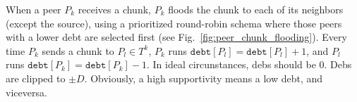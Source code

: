 \label{sec:chunk_flooding}
\begin{figure*}
  \caption{Chunk flooding at peers.\label{fig:peer_chunk_flooding}}
\end{figure*}
When a peer $P_k$ receives a chunk, $P_k$ floods the chunk to each of
its neighbors (except the source), using a prioritized round-robin
schema where those peers with a lower debt are selected first (see
Fig.~\ref{fig:peer_chunk_flooding}). Every time $P_k$ sends a chunk to
$P_l\in T^k$, $P_k$ runs $\mathtt{debt}[P_l] = \mathtt{debt}[P_l]+1$,
and $P_l$ runs $\mathtt{debt}[P_k] = \mathtt{debt}[P_k]-1$. In ideal
circunstances, debs should be $0$. Debs are clipped to $\pm
D$. Obviously, a high supportivity means a low debt, and viceversa.

\begin{comment}
In each round, peers check if a chunk have been received from the rest
of peers of the team (${\cal P}_k\in {\cal T}_j)$). If not, peers send
a $[\mathtt{propagate}~{\cal P}_i]$ to one or more (possibly
to the rest of) peers of the team, where ${\cal P}_i$ is the origin peer
of the missing chunk. At this point, the process continues as
described in Section~\ref{dbs:chunk_flooding}.
\end{comment}

\begin{comment}
For each ${\cal P}_k\in N({\cal P}_i)$, ${\cal P}_i$ checks if a chunk
has been received from ${\cal P}_k$. If ${\cal P}_i$ detects that
${\cal P}_k$ has not sent a chunk to it during $L$ consecutive rounds,
performs $N({\cal P}_i) = N({\cal P}_i)\setminus{\cal P}_k$, and stops
sending to ${\cal P}_k$ more chunks.
\end{comment}
\begin{comment}
computes a
``chunk-debt'', denoted by $d({\cal P}_k)$, that is incremented each
time a chunk is received from ${\cal P}_k$ and decremented each time a
chunk is sent to ${\cal P}_k$. If ${\cal P}_i$ verifies that $d({\cal
  P}_k)>D$ (the maximum debt), then ${\cal P}_i$ considers that ${\cal
  P}_k$ is unable to communicate with it, performs $N({\cal P}_i) =
N({\cal P}_i)\setminus{\cal P}_k$, and stops sending to ${\cal P}_k$
more chunks.
\end{comment}


